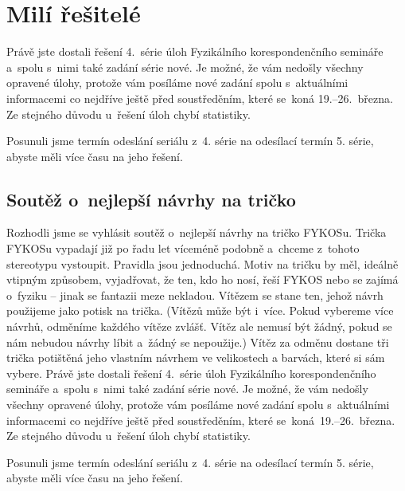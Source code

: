 \section{Milí řešitelé}
Právě jste dostali řešení 4.~série úloh Fyzikálního korespondenčního 
semináře a~spolu s~nimi také zadání série nové. Je možné, že vám 
nedošly všechny opravené úlohy, protože vám posíláme 
nové zadání spolu s~aktuálními informacemi co nejdříve ještě před 
soustředěním, které se~koná 19.--26.~března. Ze stejného důvodu 
u~řešení úloh chybí statistiky.
 
Posunuli jsme termín odeslání seriálu z~4. série na odesílací termín
5. série, abyste měli více času na jeho řešení.

\subsection{Soutěž o~nejlepší návrhy na tričko}
Rozhodli jsme se vyhlásit soutěž o~nejlepší návrhy na tričko FYKOSu.
Trička FYKOSu vypadají již po řadu let víceméně podobně a~chceme
z~tohoto stereotypu vystoupit. Pravidla jsou jednoduchá.
Motiv na tričku by měl, ideálně vtipným způsobem, vyjadřovat, že 
ten, kdo ho nosí, řeší FYKOS nebo se zajímá o~fyziku -- jinak se 
fantazii meze nekladou. Vítězem se stane 
ten, jehož návrh použijeme jako potisk na trička. (Vítězů může být 
i~více. Pokud vybereme více návrhů, odměníme každého vítěze zvlášť.
Vítěz ale nemusí být žádný, pokud se nám nebudou návrhy líbit a~žádný
se nepoužije.) Vítěz za odměnu dostane tři trička potištěná
jeho vlastním návrhem ve velikostech a barvách, které si sám vybere.
Právě jste dostali řešení 4.~série úloh Fyzikálního korespondenčního 
semináře a~spolu s~nimi také zadání série nové. Je možné, že vám 
nedošly všechny opravené úlohy, protože vám posíláme 
nové zadání spolu s~aktuálními informacemi co nejdříve ještě před 
soustředěním, které se~koná~19.--26.~března. Ze stejného důvodu 
u~řešení úloh chybí statistiky.
 
Posunuli jsme termín odeslání seriálu z~4. série na odesílací termín
5. série, abyste měli více času na jeho řešení.

